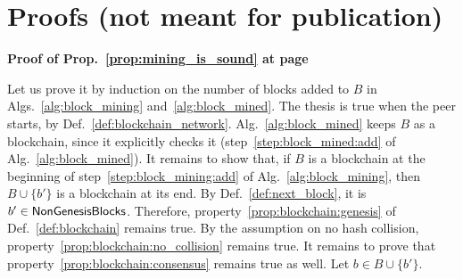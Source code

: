 \newpage

\appendix
\section{Proofs (not meant for publication)}

\noindent
\textbf{Proof of Prop.~\ref{prop:mining_is_sound} at page~\pageref{prop:mining_is_sound}}

\noindent
  Let us prove it by induction on the number of blocks added to $B$ in Algs.~\ref{alg:block_mining}
  and~\ref{alg:block_mined}. The thesis is true when the peer starts,
  by Def.~\ref{def:blockchain_network}. Alg.~\ref{alg:block_mined} keeps $B$
  as a blockchain, since it explicitly checks it (step~\ref{step:block_mined:add} of
  Alg.~\ref{alg:block_mined}). It remains to show that, if $B$ is a blockchain at the beginning
  of step~\ref{step:block_mining:add} of Alg.~\ref{alg:block_mining}, then $B\cup\{b'\}$ is a
  blockchain at its end. By Def.~\ref{def:next_block}, it is $b'\in{\mathsf{NonGenesisBlocks}}$.
  Therefore, property~\ref{prop:blockchain:genesis} of Def.~\ref{def:blockchain} remains true.
  By the assumption on no hash collision, property~\ref{prop:blockchain:no_collision} remains true.
  It remains to prove that property~\ref{prop:blockchain:consensus} remains true as well.
  Let $b\in B\cup\{b'\}$.
